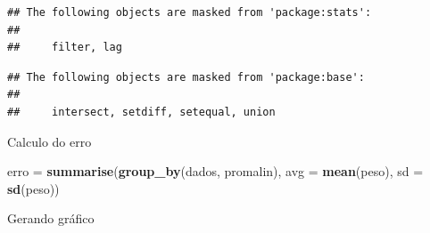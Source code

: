 \documentclass[
]{book}
\newenvironment{Shaded}{\begin{snugshade}}{\end{snugshade}}
\newcommand{\DataTypeTok}[1]{\textcolor[rgb]{0.13,0.29,0.53}{#1}}
\newcommand{\KeywordTok}[1]{\textcolor[rgb]{0.13,0.29,0.53}{\textbf{#1}}}
\newcommand{\NormalTok}[1]{#1}
\newcommand{\StringTok}[1]{\textcolor[rgb]{0.31,0.60,0.02}{#1}}
\begin{document}
\begin{verbatim}
## The following objects are masked from 'package:stats':
## 
##     filter, lag
\end{verbatim}

\begin{verbatim}
## The following objects are masked from 'package:base':
## 
##     intersect, setdiff, setequal, union
\end{verbatim}

Calculo do erro

\begin{Shaded}
\begin{Highlighting}[]
\NormalTok{erro =}\StringTok{ }\KeywordTok{summarise}\NormalTok{(}\KeywordTok{group_by}\NormalTok{(dados, promalin), }
       \DataTypeTok{avg =} \KeywordTok{mean}\NormalTok{(peso), }\DataTypeTok{sd =} \KeywordTok{sd}\NormalTok{(peso))}
\end{Highlighting}
\end{Shaded}

Gerando gráfico
\end{document}
